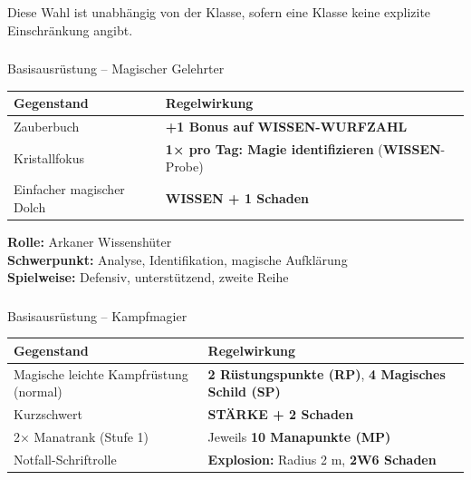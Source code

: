 Diese Wahl ist unabhängig von der Klasse,
sofern eine Klasse keine explizite Einschränkung angibt.

\subsubsection*{}

\begin{rulebox}{Basisausrüstung – Magischer Gelehrter}
	\begin{tabular}{lp{9cm}}
		\toprule
		\textbf{Gegenstand} & \textbf{Regelwirkung} \\
		\midrule
		Zauberbuch &
		\textbf{+1 Bonus auf WISSEN-WURFZAHL} \\
		
		Kristallfokus &
		\textbf{1× pro Tag: Magie identifizieren}
		(\textbf{WISSEN}-Probe) \\
		
		Einfacher magischer Dolch &
		\textbf{WISSEN + 1 Schaden} \\
		
		\bottomrule
	\end{tabular}
\end{rulebox}

\textbf{Rolle:} Arkaner Wissenshüter\\  
\textbf{Schwerpunkt:} Analyse, Identifikation, magische Aufklärung\\  
\textbf{Spielweise:} Defensiv, unterstützend, zweite Reihe\\

\subsubsection*{}

\begin{rulebox}{Basisausrüstung – Kampfmagier}
	\begin{tabular}{lp{9cm}}
		\toprule
		\textbf{Gegenstand} & \textbf{Regelwirkung} \\
		\midrule
		Magische leichte Kampfrüstung (normal) &
		\textbf{2 Rüstungspunkte (RP)},
		\textbf{4 Magisches Schild (SP)} \\
		
		Kurzschwert &
		\textbf{STÄRKE + 2 Schaden} \\
		
		2× Manatrank (Stufe 1) &
		Jeweils \textbf{10 Manapunkte (MP)} \\
		
		Notfall-Schriftrolle &
		\textbf{Explosion:}
		Radius 2 m, \textbf{2W6 Schaden} \\
		
		\bottomrule
	\end{tabular}
\end{rulebox}

